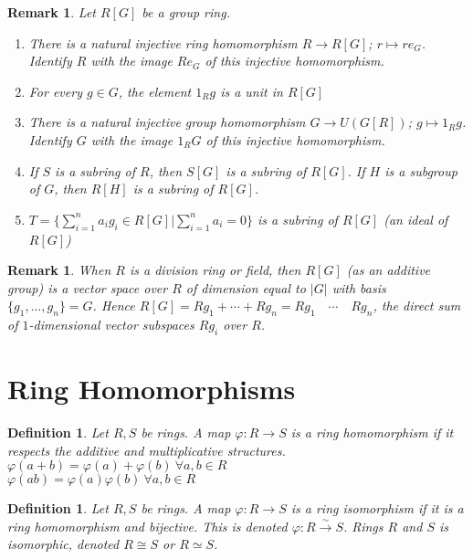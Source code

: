 \documentclass[a4paper,sfsidenotes,openany]{tufte-book}
\theoremstyle{theorem}
\newtheorem{definition}[theorem]{Definition}
\newtheorem{remark}[theorem]{Remark}
\begin{document}
\begin{fullwidth}
\begin{remark}
Let $R[G]$ be a group ring.
\begin{enumerate}[label=(\roman*),leftmargin=0pt, itemindent=4em, align=left]
\item There is a natural injective ring homomorphism $R \rightarrow R[G]$; $r \mapsto r e_G$. Identify $R$ with the image $R e_G$ of this injective homomorphism.
\item For every $g \in G$, the element $1_R g$ is a unit in $R[G]$
\item There is a natural injective group homomorphism $G \rightarrow U(G[R])$; $g \mapsto 1_R g$. Identify $G$ with the image $1_R G$ of this injective homomorphism.
\item If $S$ is a subring of $R$, then $S[G]$ is a subring of $R[G]$. If $H$ is a subgroup of $G$, then $R[H]$ is a subring of $R[G]$.
\item $T = \{\sum_{i=1}^{n} a_i g_i \in R[G] | \sum_{i=1}^{n} a_i = 0\}$ is a subring of $R[G]$ (an ideal of $R[G]$)
\end{enumerate}
\end{remark}
\>

\begin{remark}
When $R$ is a division ring or field, then $R[G]$ (as an additive group) is a vector space over $R$ of dimension equal to $\left| G \right|$ with basis $\{g_1, \ldots, g_n\} = G$.
Hence $R[G] = Rg_1 + \cdots + Rg_n = Rg_1 \quad \cdots \quad Rg_n$, the direct sum of $1$-dimensional vector subspaces $Rg_i$ over $R$.\\
\end{remark}
\>

\section{Ring Homomorphisms}

\begin{definition}
Let $R, S$ be rings. A map $\varphi: R \rightarrow S$ is a \textit{{\color{blue} ring homomorphism}} if it respects the additive and multiplicative structures.\\
$\varphi(a+b) = \varphi(a) + \varphi(b) \ \forall a, b \in R$\\
$\varphi(ab) = \varphi(a)\varphi(b) \ \forall a, b \in R$\\
\end{definition}
\>

\begin{definition}
Let $R, S$ be rings. A map $\varphi: R \rightarrow S$ is a \textit{{\color{blue} ring isomorphism}} if it is a ring homomorphism and bijective.
This is denoted $\varphi: R \xrightarrow{\sim} S$. Rings $R$ and $S$ is \textit{{\color{blue} isomorphic}}, denoted $R \cong S$ or $R \simeq S$.
\end{definition}
\>


\end{fullwidth}
\end{document}
